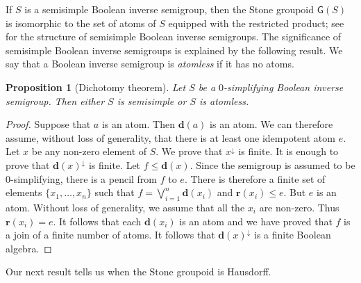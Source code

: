 \documentclass[a4paper]{amsart}
\newtheorem{proposition}[theorem]{Proposition}
\begin{document}
If $S$ is a semisimple Boolean inverse semigroup,
then the Stone groupoid $\mathsf{G}(S)$ is isomorphic to the set of atoms of $S$ equipped with the restricted product;
see \cite{Lawson2021} for the structure of semisimple Boolean inverse semigroups.
The significance of semisimple Boolean inverse semigroups is explained by the following result.
We say that a Boolean inverse semigroup is {\em atomless} if it has no atoms.

\begin{proposition}[Dichotomy theorem] Let $S$ be a $0$-simplifying Boolean inverse semigroup.
Then either $S$ is semisimple or $S$ is atomless.
\end{proposition}
\begin{proof} Suppose that $a$ is an atom.
Then $\mathbf{d}(a)$ is an atom.
We can therefore assume, without loss of generality, that there is at least one idempotent atom $e$.
Let $x$ be any non-zero element of $S$.
We prove that $x^{\downarrow}$ is finite.
It is enough to prove that $\mathbf{d}(x)^{\downarrow}$ is finite.
Let $f \leq \mathbf{d}(x)$.
Since the semigroup is assumed to be $0$-simplifying, there is a pencil from $f$ to $e$.
There is therefore a finite set of elements $\{x_{1},\ldots, x_{n} \}$ such that $f = \bigvee_{i=1}^{n} \mathbf{d}(x_{i})$
and $\mathbf{r}(x_{i}) \leq e$.
But $e$ is an atom.
Without loss of generality, we assume that all the $x_{i}$ are non-zero.
Thus $\mathbf{r}(x_{i}) = e$.
It follows that each $\mathbf{d}(x_{i})$ is an atom
and we have proved that $f$ is a join of a finite number of atoms.
It follows that $\mathbf{d}(x)^{\downarrow}$ is a finite Boolean algebra.
\end{proof}


Our next result tells us when the Stone groupoid is Hausdorff.
\end{document}
